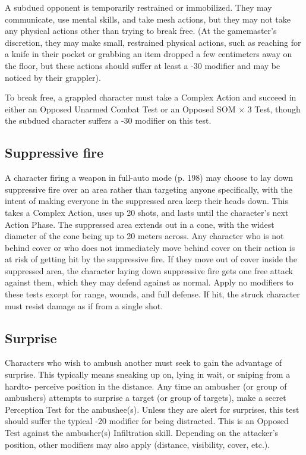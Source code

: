 A subdued opponent is temporarily restrained or immobilized. They may communicate, use mental skills, and take mesh actions, but they may not take any physical actions other than trying to break free. (At the gamemaster’s discretion, they may make small, restrained physical actions, such as reaching for a knife in their pocket or grabbing an item dropped a few centimeters away on the floor, but these actions should suffer at least a -30 modifier and may be noticed by their grappler). 

To break free, a grappled character must take a Complex Action and succeed in either an Opposed Unarmed Combat Test or an Opposed SOM $\times$ 3 Test, though the subdued character suffers a -30 modifier on this test. 



\subsection{Suppressive fire} \label{sec:suppressive-fire} 

A character firing a weapon in full-auto mode (p. 198) may choose to lay down suppressive fire over an area rather than targeting anyone specifically, with the intent of making everyone in the suppressed area keep their heads down. This takes a Complex Action, uses up 20 shots, and lasts until the character’s next Action Phase. The suppressed area extends out in a cone, with the widest diameter of the cone being up to 20 meters across. Any character who is not behind cover or who does not immediately move behind cover on their action is at risk of getting hit by the suppressive fire. If they move out of cover inside the suppressed area, the character laying down suppressive fire gets one free attack against them, which they may defend against as normal. Apply no modifiers to these tests except for range, wounds, and full defense. If hit, the struck character must resist damage as if from a single shot. 



\subsection{Surprise} \label{sec:surprise} 

Characters who wish to ambush another must seek to gain the advantage of surprise. This typically means sneaking up on, lying in wait, or sniping from a hardto- perceive position in the distance. Any time an ambusher (or group of ambushers) attempts to surprise a target (or group of targets), make a secret Perception Test for the ambushee(s). Unless they are alert for surprises, this test should suffer the typical -20 modifier for being distracted. This is an Opposed Test against the ambusher(s) Infiltration skill. Depending on the attacker’s position, other modifiers may also apply (distance, visibility, cover, etc.). 

